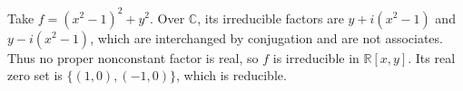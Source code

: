 Take $f=(x^2-1)^2+y^2$. Over $\mathbb C$, its irreducible factors are $y+i(x^2-1)$ and $y-i(x^2-1)$, which are interchanged by conjugation and are not associates. Thus no proper nonconstant factor is real, so $f$ is irreducible in $\mathbb R[x,y]$. Its real zero set is $\{(1,0),(-1,0)\}$, which is reducible.
